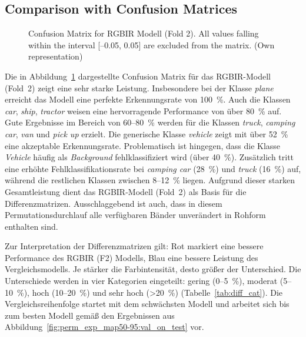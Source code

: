 
\FloatBarrier
\subsection{Comparison with Confusion Matrices}
\label{subsec:permexp_comp_confusion_matric}


\begin{figure}[htbp]
    \centering
    
    \caption[Confusion Matrix for RGBIR Modell (Fold 2)]{Confusion Matrix for RGBIR Modell (Fold 2). All values falling within the interval [–0.05, 0.05] are excluded from the matrix. (Own representation)}
    \label{fig:perm_exp_confM_rgbir_f2}
\end{figure}

Die in Abbildung~\ref{fig:perm_exp_confM_rgbir_f2} dargestellte Confusion Matrix für das RGBIR-Modell (Fold~2) zeigt eine sehr starke Leistung. Insbesondere bei der Klasse \textit{plane} erreicht das Modell eine perfekte Erkennungsrate von 100~\%. Auch die Klassen \textit{car}, \textit{ship}, \textit{tractor} weisen eine hervorragende Performance von über 80~\% auf. Gute Ergebnisse im Bereich von 60–80~\% werden für die Klassen \textit{truck}, \textit{camping car}, \textit{van} und \textit{pick up} erzielt. Die generische Klasse \textit{vehicle} zeigt mit über 52~\% eine akzeptable Erkennungsrate. Problematisch ist hingegen, dass die Klasse \textit{Vehicle} häufig als \textit{Background} fehlklassifiziert wird (über 40~\%). Zusätzlich tritt eine erhöhte Fehlklassifikationsrate bei \textit{camping car} (28~\%) und \textit{truck} (16~\%) auf, während die restlichen Klassen zwischen 8–12~\% liegen. Aufgrund dieser starken Gesamtleistung dient das RGBIR-Modell (Fold~2) als Basis für die Differenzmatrizen. Ausschlaggebend ist auch, dass in diesem Permutationsdurchlauf alle verfügbaren Bänder unverändert in Rohform enthalten sind.

Zur Interpretation der Differenzmatrizen gilt: Rot markiert eine bessere Performance des RGBIR (F2) Modells, Blau eine bessere Leistung des Vergleichsmodells. Je stärker die Farbintensität, desto größer der Unterschied. Die Unterschiede werden in vier Kategorien eingeteilt: gering (0–5~\%), moderat (5–10~\%), hoch (10–20~\%) und sehr hoch (>20~\%) (Tabelle~\ref{tab:diff_cat}). Die Vergleichsreihenfolge startet mit dem schwächsten Modell und arbeitet sich bis zum besten Modell gemäß den Ergebnissen aus Abbildung~\ref{fig:perm_exp_map50-95:val_on_test} vor.

